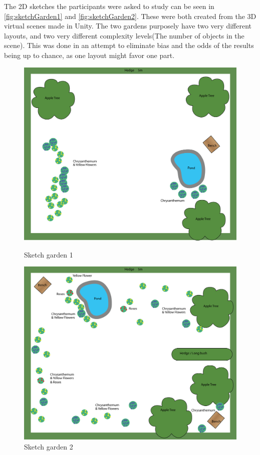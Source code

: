 The 2D sketches the participants were asked to study can be seen in \autoref{fig:sketchGarden1} and \autoref{fig:sketchGarden2}. These were both created from the 3D virtual scenes made in Unity. The two gardens purposely have two very different layouts, and two very different complexity levels(The number of objects in the scene). This was done in an attempt to eliminate bias and the odds of the results being up to chance, as one layout might favor one part.
\begin{figure}[H]
	\centering
	\begin{minipage}[b]{0.49\textwidth}
	\includegraphics[width=1.0\linewidth]{figure/Evaluation/Garden1.png}
	\caption{Sketch garden 1}
	\label{fig:sketchGarden1}
	\end{minipage}
	\hfill
	\begin{minipage}[b]{0.49\textwidth}
	\includegraphics[width=1.0\linewidth]{figure/Evaluation/Garden2.png}
	\caption{Sketch garden 2}
	\label{fig:sketchGarden2}
	\end{minipage}
\end{figure}

